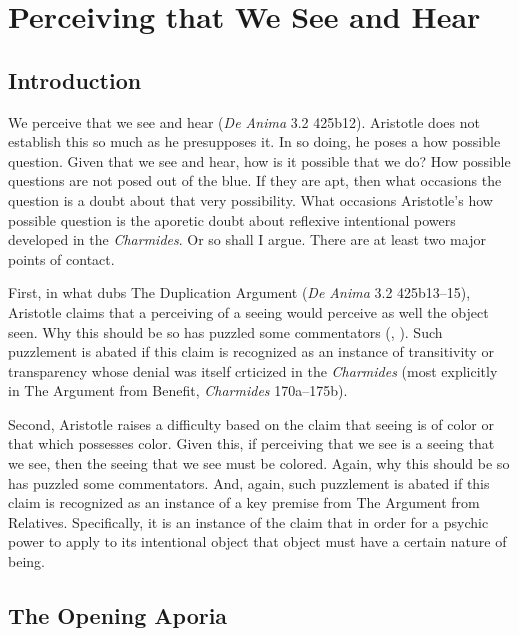 \chapter{Perceiving that We See and Hear} %
\label{cha:perceiving}

\section{Introduction} %
\label{sec:introduction}

We perceive that we see and hear (\emph{De Anima} 3.2 425b12). Aristotle does not establish this so much as he presupposes it. In so doing, he poses a how possible question. Given that we see and hear, how is it possible that we do? How possible questions are not posed out of the blue. If they are apt, then what occasions the question is a doubt about that very possibility. What occasions Aristotle's how possible question is the aporetic doubt about reflexive intentional powers developed in the \emph{Charmides}. Or so shall I argue. There are at least two major points of contact. 

First, in what \citet{caston02} dubs The Duplication Argument (\emph{De Anima} 3.2 425b13–15), Aristotle claims that a perceiving of a seeing would perceive as well the object seen. Why this should be so has puzzled some commentators (\citealt[435]{Hicks:1907uq}, \citealt[121–2]{Hamlyn:1961ys}). Such puzzlement is abated if this claim is recognized as an instance of transitivity or transparency whose denial was itself crticized in the \emph{Charmides} (most explicitly in The Argument from Benefit, \emph{Charmides} 170a–175b).

Second, Aristotle raises a difficulty based on the claim that seeing is of color or that which possesses color. Given this, if perceiving that we see is a seeing that we see, then the seeing that we see must be colored. Again, why this should be so has puzzled some commentators. And, again, such puzzlement is abated if this claim is recognized as an instance of a key premise from The Argument from Relatives. Specifically, it is an instance of the claim that in order for a psychic power to apply to its intentional object that object must have a certain nature of being.



\section{The Opening Aporia} %
\label{sec:the_opening_aporia}




